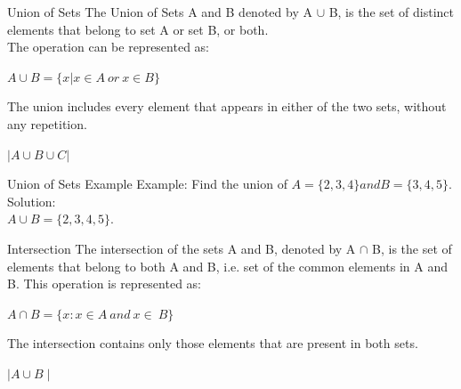 \documentclass{beamer}
\begin{document}
\begin{frame}{Union of Sets}
The Union of Sets A and B denoted by A $\cup$ B, is the set of distinct elements that belong to set A or set B, or both.\\
The operation can be represented as:\\
\begin{center}
    $A\cup B=\{x|x\in A\ or\ x\in B\}$
\end{center}
 The union includes every element that appears in either of the two sets, without any repetition.
 \begin{center}
     

 \setlength{\fboxsep}{5pt}
 \end{center}
 \begin{center}
 {$ | A \cup B \cup C | $}   
\end{center}

\end{frame}
\begin{frame}{Union of Sets Example}
    Example: Find the union of $A = \{2, 3, 4\} and B = \{3, 4, 5\}$.\\
Solution:\\
\centering
$A \cup B = \{2, 3, 4, 5\}.$
\end{frame}

\begin{frame}{Intersection}
    The intersection of the sets A and B, denoted by A $\cap$ B, is the set of elements that belong to both A and B, i.e. set of the common elements in A and B. This operation is represented as:
    \begin{center}
        $A \cap B =\{x :x\in A\ and\ x\in\ B\}$
    \end{center}
    \begin{center}
        
   
    The intersection contains only those elements that are present in both sets. 
    \end{center}
    \begin{center}
        
    \setlength{\fboxsep}{8pt}
\end{center}
\begin{center}
 {$ \mid A \cup B \mid $}   
\end{center}
    
\end{frame}
\end{document}
